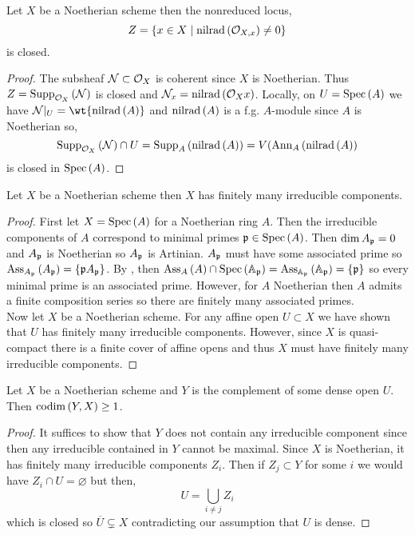 \documentclass[12pt]{article}
\begin{document}
\begin{lemma}
Let $X$ be a Noetherian scheme then the nonreduced locus,
\[ Z = \{ x \in X \mid \mathrm{nilrad}\left( \mathcal{O}_{X, x} \right) \neq 0 \} \]
is closed.
\end{lemma} 

\begin{proof}
The subsheaf $\mathcal{N} \subset \mathcal{O}_{X}$ is coherent since $X$ is Noetherian. Thus $Z = \mathrm{Supp}_{\mathcal{O}_{X}}\left(\mathcal{N} \right)$ is closed and $\mathcal{N}_x = \mathrm{nilrad}\left( \mathcal{O}_{X}{x} \right)$. Locally, on $U = \mathrm{Spec}\left( A \right)$ we have $\Nil |_U  = \wt{\nilrad{A}}$ and $\mathrm{nilrad}\left( A \right)$ is a f.g. $A$-module since $A$ is Noetherian so,
\[ \mathrm{Supp}_{\mathcal{O}_{X}}\left(\mathcal{N} \right) \cap U = \mathrm{Supp}_{A}\left(\mathrm{nilrad}\left( A \right) \right) = V(\mathrm{Ann}_{A}\left(\mathrm{nilrad}\left( A \right)\right) \]
is closed in $\mathrm{Spec}\left( A \right)$. 
\end{proof}

\begin{lemma}
Let $X$ be a Noetherian scheme then $X$ has finitely many irreducible components.
\end{lemma}

\begin{proof}
First let $X = \mathrm{Spec}\left( A \right)$ for a Noetherian ring $A$. Then the irreducible components of $A$ correspond to minimal primes $\mathfrak{p} \in \mathrm{Spec}\left( A \right)$. Then $\dim{A_{\mathfrak{p}}} = 0$ and $A_{\mathfrak{p}}$ is Noetherian so $A_{\mathfrak{p}}$ is Artinian. $A_{\mathfrak{p}}$ must have some associated prime so $\mathrm{Ass}_{A_{\mathfrak{p}}}\left( A_{\mathfrak{p}} \right) = \{ \mathfrak{p} A_{\mathfrak{p}} \}$.  By \cite[\href{https://stacks.math.columbia.edu/tag/05BZ}{Tag 05BZ}]{stacks-project}, then $\mathrm{Ass}_{A}\left( A \right) \cap \mathrm{Spec}\left( \mathbb{A}_{\mathfrak{p}} \right) = \mathrm{Ass}_{\mathbb{A}_{\mathfrak{p}}}\left( \mathbb{A}_{\mathfrak{p}} \right) = \{ \mathfrak{p} \}$ so every minimal prime is an associated prime. However, for $A$ Noetherian then $A$ admits a finite composition series so there are finitely many associated primes.
\bigskip\\
Now let $X$ be a Noetherian scheme. For any affine open $U \subset X$ we have shown that $U$ has finitely many irreducible components. However, since $X$ is quasi-compact there is a finite cover of affine opens and thus $X$ must have finitely many irreducible components. 
\end{proof}

\begin{lemma}
Let $X$ be a Noetherian scheme and $Y$ is the complement of some dense open $U$. Then $\mathrm{codim}\left( Y, X \right) \ge 1$.
\end{lemma}

\begin{proof}
It suffices to show that $Y$ does not contain any irreducible component since then any irreducible contained in $Y$ cannot be maximal. Since $X$ is Noetherian, it has finitely many irreducible components $Z_i$. Then if $Z_j \subset Y$ for some $i$ we would have $Z_i \cap U = \varnothing$ but then,
\[ U = \bigcup_{i \neq j} Z_i \]
which is closed so $\overline{U} \subsetneq X$ contradicting our assumption that $U$ is dense.
\end{proof}
\end{document}
